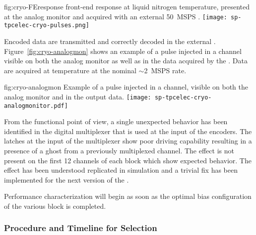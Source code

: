 \begin{dunefigure}
{fig:cryo-FEresponse}
{  front-end response at liquid nitrogen temperature, presented at the analog monitor and acquired with an external \SI{50}{MSPS} .}
\texttt{[image: sp-tpcelec-cryo-pulses.png]}
\end{dunefigure}

Encoded data are transmitted and correctly decoded in the external . 
Figure~\ref{fig:cryo-analogmon} shows an example of a pulse injected in a channel 
visible on both the analog monitor as well as in the data acquired by the . 
Data are acquired at \lntwo temperature at the nominal $\sim$\SI{2}{MSPS} rate.

\begin{dunefigure}
{fig:cryo-analogmon}
{Example of a pulse injected in a   channel, visible on both the analog monitor and in the output data.}
\texttt{[image: sp-tpcelec-cryo-analogmonitor.pdf]}
\end{dunefigure}

From the functional point of view, a single unexpected behavior has been identified 
in the digital multiplexer that is used at the input of the encoders. The latches
at the input of the multiplexer show poor driving capability resulting in a presence
of a ghost from a previously multiplexed channel. The effect is not present on the 
first 12 channels of each block which show expected behavior. The effect has been
understood replicated in simulation and a trivial fix has been implemented for 
the next version of the .

Performance characterization will begin as soon as the optimal bias configuration of 
the various block is completed. 


\subsubsection{Procedure and Timeline for  Selection}
\label{sec:fdsp-tpcelec-design-femb-selection}

